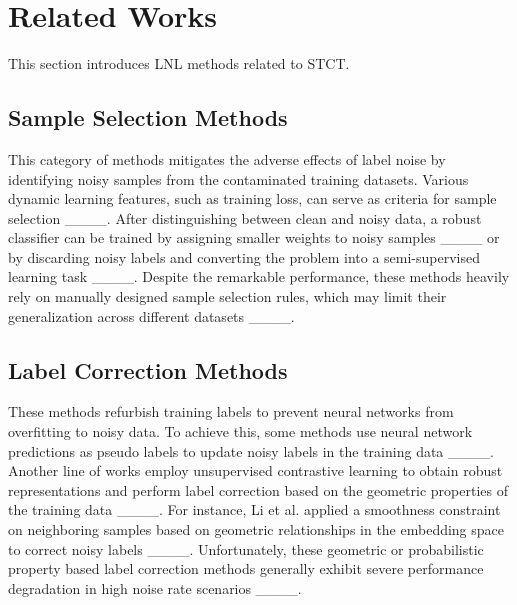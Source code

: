 \section{Related Works}
\noindent This section introduces LNL methods related to STCT.

\subsection{Sample Selection Methods}

This category of methods mitigates the adverse effects of label noise by identifying noisy samples from the contaminated training datasets. Various dynamic learning features, such as training loss, can serve as criteria for sample selection ____. After distinguishing between clean and noisy data, a robust classifier can be trained by assigning smaller weights to noisy samples ____ or by discarding noisy labels and converting the problem into a semi-supervised learning task ____. Despite the remarkable performance, these methods heavily rely on manually designed sample selection rules, which may limit their generalization across different datasets ____.

\subsection{Label Correction Methods}

These methods refurbish training labels to prevent neural networks from overfitting to noisy data. To achieve this, some methods use neural network predictions as pseudo labels to update noisy labels in the training data ____. Another line of works employ unsupervised contrastive learning to obtain robust representations and perform label correction based on the geometric properties of the training data ____. For instance, Li et al. applied a smoothness constraint on neighboring samples based on geometric relationships in the embedding space to correct noisy labels ____. Unfortunately, these geometric or probabilistic property based label correction methods generally exhibit severe performance degradation in high noise rate scenarios ____.

